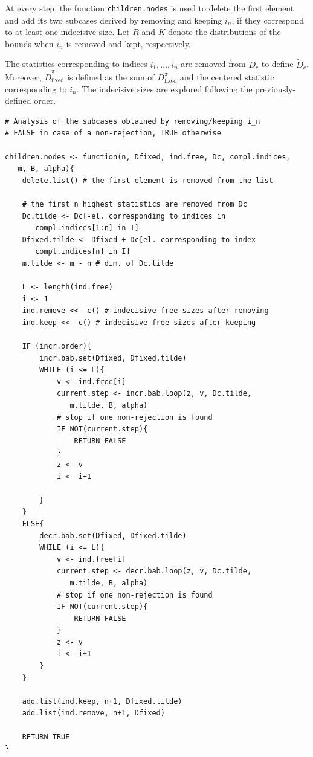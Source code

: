 \documentclass[11pt,a4paper,openright,twoside]{article}
\begin{document}
At every step, the function \texttt{children.nodes} is used to delete the first element and add its two subcases derived by removing and keeping $i_n$, if they correspond to at least one indecisive size. Let $R$ and $K$ denote the distributions of the bounds when $i_n$ is removed and kept, respectively.

The statistics corresponding to indices $i_1,\ldots,i_{n}$ are removed from $D_c$ to define $\tilde{D}_c$. Moreover, $\tilde{D}_{\text{fixed}}^{\pi}$ is defined as the sum of $D_{\text{fixed}}^{\pi}$ and the centered statistic corresponding to $i_n$. The indecisive sizes are explored following the previously-defined order.

\begin{lstlisting}
# Analysis of the subcases obtained by removing/keeping i_n
# FALSE in case of a non-rejection, TRUE otherwise

children.nodes <- function(n, Dfixed, ind.free, Dc, compl.indices,
   m, B, alpha){
	delete.list() # the first element is removed from the list

	# the first n highest statistics are removed from Dc
	Dc.tilde <- Dc[-el. corresponding to indices in
	   compl.indices[1:n] in I]
	Dfixed.tilde <- Dfixed + Dc[el. corresponding to index
	   compl.indices[n] in I]
	m.tilde <- m - n # dim. of Dc.tilde

	L <- length(ind.free)
	i <- 1
	ind.remove <<- c() # indecisive free sizes after removing
	ind.keep <<- c() # indecisive free sizes after keeping

	IF (incr.order){
		incr.bab.set(Dfixed, Dfixed.tilde)
		WHILE (i <= L){
			v <- ind.free[i]
			current.step <- incr.bab.loop(z, v, Dc.tilde,
			   m.tilde, B, alpha)
			# stop if one non-rejection is found
			IF NOT(current.step){
				RETURN FALSE
			}
			z <- v
			i <- i+1
			
		}
	}
	ELSE{
		decr.bab.set(Dfixed, Dfixed.tilde)
		WHILE (i <= L){
			v <- ind.free[i]
			current.step <- decr.bab.loop(z, v, Dc.tilde,
			   m.tilde, B, alpha)
			# stop if one non-rejection is found
			IF NOT(current.step){
				RETURN FALSE
			}
			z <- v
			i <- i+1
		}
	}

	add.list(ind.keep, n+1, Dfixed.tilde)
	add.list(ind.remove, n+1, Dfixed)

	RETURN TRUE
}
\end{lstlisting}




\vspace{3mm}
\end{document}
